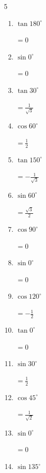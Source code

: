 \begin{multicols}{5}
\begin{enumerate}
  \item $\displaystyle \tan{180^\circ}$

        $\displaystyle =0$

  \item $\displaystyle \sin{0^\circ}$

        $\displaystyle =0$

  \item $\displaystyle \tan{30^\circ}$

        $\displaystyle =\frac{1}{\sqrt{3}}$

  \item $\displaystyle \cos{60^\circ}$

        $\displaystyle =\frac{1}{2}$

  \item $\displaystyle \tan{150^\circ}$

        $\displaystyle =-\frac{1}{\sqrt{3}}$

  \item $\displaystyle \sin{60^\circ}$

        $\displaystyle =\frac{\sqrt{3}}{2}$

  \item $\displaystyle \cos{90^\circ}$

        $\displaystyle =0$

  \item $\displaystyle \sin{0^\circ}$

        $\displaystyle =0$

  \item $\displaystyle \cos{120^\circ}$

        $\displaystyle =-\frac{1}{2}$

  \item $\displaystyle \tan{0^\circ}$

        $\displaystyle =0$

  \item $\displaystyle \sin{30^\circ}$

        $\displaystyle =\frac{1}{2}$

  \item $\displaystyle \cos{45^\circ}$

        $\displaystyle =\frac{1}{\sqrt{2}}$

  \item $\displaystyle \sin{0^\circ}$

        $\displaystyle =0$

  \item $\displaystyle \sin{135^\circ}$


\end{enumerate}
\end{multicols}
